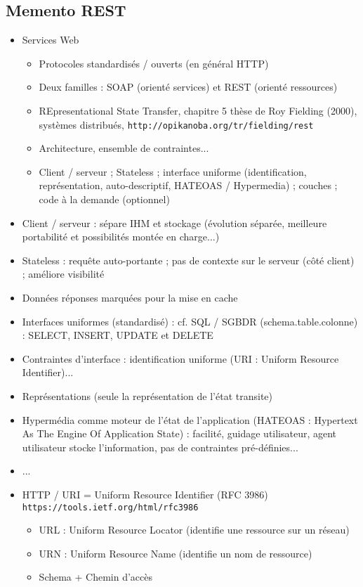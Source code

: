 \documentclass[11pt,twoside,a4paper]{article}
\begin{document}
\begin{landscape}


\begin{multicols}{2}
	\section*{Memento REST}
	
	\begin{itemize}
		\item Services Web
		\begin{itemize}
			\item Protocoles standardis{\'e}s / ouverts (en g{\'e}n{\'e}ral HTTP)
			\item Deux familles : SOAP (orient{\'e} services) et REST (orient{\'e} ressources)
			\item REpresentational State Transfer, chapitre 5 th{\`e}se de Roy Fielding (2000), syst{\`e}mes distribu{\'e}s, \texttt{http://opikanoba.org/tr/fielding/rest}
			\item Architecture, ensemble de contraintes... 
			\item Client / serveur ; Stateless ; interface uniforme (identification, repr{\'e}sentation, auto-descriptif, HATEOAS / Hypermedia) ; couches ; code {\`a} la demande (optionnel)
		\end{itemize}
		\item Client / serveur : s{\'e}pare IHM et stockage ({\'e}volution s{\'e}par{\'e}e, meilleure portabilit{\'e} et possibilit{\'e}s mont{\'e}e en charge...)
		\item Stateless : requ{\^e}te auto-portante ; pas de contexte sur le serveur (c{\^o}t{\'e} client) ; am{\'e}liore visibilit{\'e}
		\item Donn{\'e}es r{\'e}ponses marqu{\'e}es pour la mise en cache
		\item Interfaces uniformes (standardis{\'e}) : cf. SQL / SGBDR (schema.table.colonne) : SELECT, INSERT, UPDATE et DELETE
		\item Contraintes d'interface : identification uniforme (URI : Uniform Resource Identifier)...
		\item Repr{\'e}sentations (seule la repr{\'e}sentation de l'{\'e}tat transite)
		\item Hyperm{\'e}dia comme moteur de l'{\'e}tat de l'application (HATEOAS : Hypertext As The Engine Of Application State) : facilit{\'e}, guidage utilisateur, agent utilisateur stocke l'information, pas de contraintes pr{\'e}-d{\'e}finies...
		\item ...
		\item HTTP / URI = Uniform Resource Identifier (RFC 3986) \texttt{https://tools.ietf.org/html/rfc3986}
		\begin{itemize}
			\item URL : Uniform Resource Locator (identifie une ressource sur un r{\'e}seau)
			\item URN : Uniform Resource Name (identifie un nom de ressource)
			\item Schema + Chemin d'acc{\`e}s
		\end{itemize}
		

\end{itemize}
\end{multicols}
\end{landscape}
\end{document}
